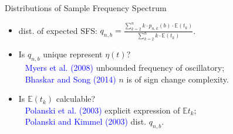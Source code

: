 \documentclass[handout]{beamer}
\begin{document}
\begin{frame}{Distributions of Sample Frequency Spectrum}
\begin{itemize}
\item dist. of expected SFS: $q_{n,b}=\frac{\sum^{n}_{k=2}k\cdot p_{n,k}(b)\cdot\mathbb{E}(t_{k})}{\sum^{n}_{k=2}k\cdot\mathbb{E} (t_{k}) }$.\\
$~~$
\item Is $q_{n,b}$ unique represent $\eta(t)$?\\
$~~$ \textcolor{blue}{Myers et al. (2008)} unbounded frequency of oscillatory;\\
$~~$ \textcolor{blue}{Bhaskar and Song (2014)} $n$ is of sign change complexity.\\
$~~$
\item Is $\mathbb{E} (t_{k})$ calculable?\\
$~~$ \textcolor{blue}{Polanski et al. (2003)} explicit expression of $\mathbb{E}t_{k}$;\\
$~~$ \textcolor{blue}{Polanski and Kimmel (2003)} dist. $q_{n,b}$. \\
$~~$
\end{itemize}
\end{frame}
\end{document}
